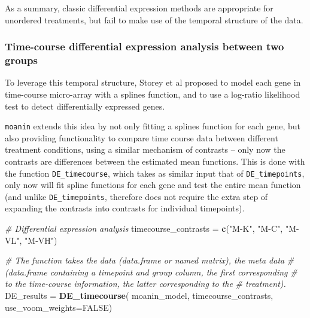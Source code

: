 \documentclass[9pt,a4paper,]{extarticle}
\newenvironment{Shaded}{\begin{snugshade}}{\end{snugshade}}
\newcommand{\CommentTok}[1]{\textcolor[rgb]{0.56,0.35,0.01}{\textit{#1}}}
\newcommand{\DataTypeTok}[1]{\textcolor[rgb]{0.13,0.29,0.53}{#1}}
\newcommand{\KeywordTok}[1]{\textcolor[rgb]{0.13,0.29,0.53}{\textbf{#1}}}
\newcommand{\NormalTok}[1]{#1}
\newcommand{\OtherTok}[1]{\textcolor[rgb]{0.56,0.35,0.01}{#1}}
\newcommand{\StringTok}[1]{\textcolor[rgb]{0.31,0.60,0.02}{#1}}
\begin{document}
As a summary, classic differential expression methods are appropriate for
unordered treatments, but fail to make use of the temporal structure of the data.

\hypertarget{time-course-differential-expression-analysis-between-two-groups}{%
\subsubsection{Time-course differential expression analysis between two groups}\label{time-course-differential-expression-analysis-between-two-groups}}

To leverage this temporal structure, Storey et al \citep{storey:significance}
proposed to model each gene in time-course micro-array with a splines
function, and to use a log-ratio likelihood test to detect differentially
expressed genes.

\texttt{moanin} extends this idea by not only fitting a splines function for each gene, but also providing functionality to compare time course
data between different treatment conditions, using a similar mechanism of
contrasts -- only now the contrasts are differences between the estimated mean
functions. This is done with the function \texttt{DE\_timecourse}, which takes as
similar input that of \texttt{DE\_timepoints}, only now will fit spline functions for each gene and test the entire mean
function (and unlike \texttt{DE\_timepoints}, therefore does not require the extra step of expanding the contrasts into contrasts for individual timepoints).

\begin{Shaded}
\begin{Highlighting}[]
\CommentTok{# Differential expression analysis}
\NormalTok{timecourse_contrasts =}\StringTok{ }\KeywordTok{c}\NormalTok{(}\StringTok{"M-K"}\NormalTok{, }\StringTok{"M-C"}\NormalTok{, }\StringTok{"M-VL"}\NormalTok{, }\StringTok{"M-VH"}\NormalTok{)}

\CommentTok{# The function takes the data (data.frame or named matrix), the meta data}
\CommentTok{# (data.frame containing a timepoint and group column, the first corresponding}
\CommentTok{# to the time-course information, the latter corresponding to the}
\CommentTok{# treatment).}
\NormalTok{DE_results =}\StringTok{ }\KeywordTok{DE_timecourse}\NormalTok{( moanin_model, timecourse_contrasts,}
    \DataTypeTok{use_voom_weights=}\OtherTok{FALSE}\NormalTok{)}
\end{Highlighting}
\end{Shaded}
\end{document}
